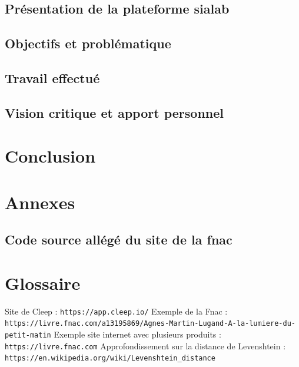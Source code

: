 \documentclass{article} %
\begin{document}
\subsection{Présentation de la plateforme sialab}
\subsection{Objectifs et problématique}
\subsection{Travail effectué}
\subsection{Vision critique et apport personnel}
\newpage


\section{Conclusion}
\newpage

\section{Annexes}
\subsection{Code source allégé du site de la fnac}
%

\newpage

\section{Glossaire}
\begin{thebibliography}{9}
	Site de Cleep : \texttt{https://app.cleep.io/}
	Exemple de la Fnac : \texttt{https://livre.fnac.com/a13195869/Agnes-Martin-Lugand-A-la-lumiere-du-petit-matin}
	Exemple site internet avec plusieurs produits : \texttt{https://livre.fnac.com}
	Approfondissement sur la distance de Levenshtein : \texttt{https://en.wikipedia.org/wiki/Levenshtein\_distance}
	
\end{thebibliography}
\newpage






\imtaMakeCover
\end{document}
